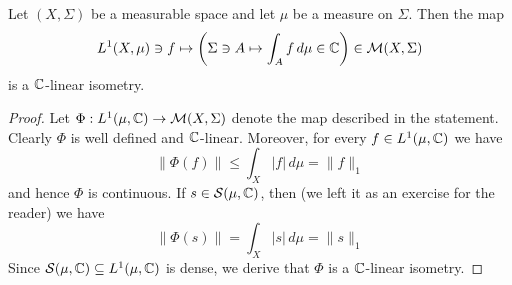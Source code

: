 \begin{theorem}\label{theorem:isometrical_embedding_of_L1_into_space_of_complex_measures}
    Let $(X,\Sigma)$ be a measurable space and let $\mu$ be a measure on $\Sigma$. Then the map
    $$L^1(X,\mu)\ni f\mapsto \left(\Sigma \ni A \mapsto \int_Af\,d\mu\in {\mathbb C}\right)\in {\mathcal M}(X,\Sigma)$$
    is a ${\mathbb C}$-linear isometry.
\end{theorem}
\begin{proof}
    Let $\Phi:L^1(\mu,{\mathbb C})\rightarrow {\mathcal M}(X,\Sigma)$ denote the map described in the statement. Clearly $\Phi$ is well defined and ${\mathbb C}$-linear. Moreover, for every $f \in L^1(\mu,{\mathbb C})$ we have
    $$\lVert \Phi(f) \rVert \leq \int_X|f|\,d\mu = \lVert f \rVert_1$$
    and hence $\Phi$ is continuous. If $s \in {\mathcal S}(\mu,{\mathbb C})$, then (we left it as an exercise for the reader) we have
    $$\lVert \Phi(s) \rVert = \int_X|s|\,d\mu = \lVert s \rVert_1$$
    Since ${\mathcal S}(\mu,{\mathbb C}) \subseteq L^1(\mu,{\mathbb C})$ is dense, we derive that $\Phi$ is a ${\mathbb C}$-linear isometry.
\end{proof}

\small



